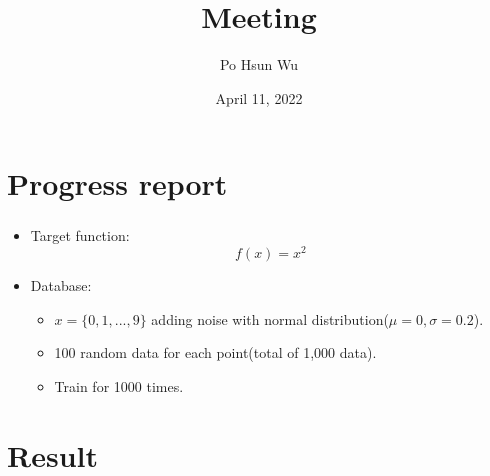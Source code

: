 \documentclass{beamer}
\date{April 11, 2022}
\title{Meeting}
\author{Po Hsun Wu}
\begin{document}
\maketitle

\section{Progress report}

\begin{frame}
    \frametitle{\secname}

    \begin{itemize}
        \item Target function:
              $$f(x)=x^2$$
        \item Database:
              \begin{itemize}
                  \item $x=\{0,1,...,9\}$ adding noise with normal distribution($\mu=0, \sigma=0.2$).
                  \item 100 random data for each point(total of 1,000 data).
                  \item Train for 1000 times.
              \end{itemize}
    \end{itemize}
\end{frame}

\section{Result}
\end{document}
